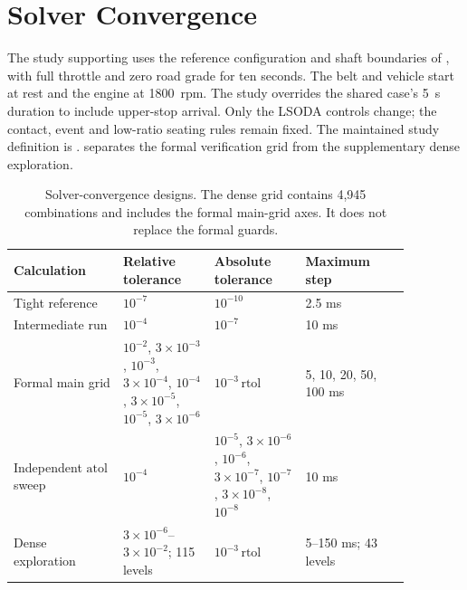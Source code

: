 \documentclass[11pt]{report}
\numberwithin{equation}{section}
\begin{document}
\section{Solver Convergence}
\label{app:study_solver_convergence}

The study supporting  uses the reference
configuration and shaft boundaries of
, with full
throttle and zero road grade for ten seconds. The belt and vehicle start at
rest and the engine at \SI{1800}{rpm}. The study overrides the shared case's
\SI{5}{s} duration to include upper-stop arrival. Only the LSODA controls
change; the contact, event and low-ratio seating rules remain fixed. The
maintained study definition is
.
 separates the formal verification grid
from the supplementary dense exploration.

\begin{table}[H]
\centering\small
\renewcommand{\arraystretch}{1.12}
\begin{tabular}{@{}p{0.24\linewidth}p{0.20\linewidth}p{0.20\linewidth}p{0.23\linewidth}@{}}
\toprule
Calculation & Relative tolerance & Absolute tolerance & Maximum step \\
\midrule
Tight reference & $10^{-7}$ & $10^{-10}$ & 2.5 ms \\
Intermediate run & $10^{-4}$ & $10^{-7}$ & 10 ms \\
Formal main grid & $10^{-2}$, $3\times10^{-3}$, $10^{-3}$, $3\times10^{-4}$,
 $10^{-4}$, $3\times10^{-5}$, $10^{-5}$, $3\times10^{-6}$
 & $10^{-3}\,\mathrm{rtol}$ & 5, 10, 20, 50, 100 ms \\
Independent $\mathrm{atol}$ sweep & $10^{-4}$ & $10^{-5}$, $3\times10^{-6}$,
 $10^{-6}$, $3\times10^{-7}$, $10^{-7}$, $3\times10^{-8}$, $10^{-8}$ & 10 ms \\
Dense exploration & $3\times10^{-6}$--$3\times10^{-2}$; 115 levels
 & $10^{-3}\,\mathrm{rtol}$ & 5--150 ms; 43 levels \\
\bottomrule
\end{tabular}
\caption{Solver-convergence designs. The dense grid contains 4,945 combinations
and includes the formal main-grid axes. It does not replace the formal guards.}
\label{tab:solver_convergence_design}
\end{table}
\end{document}
